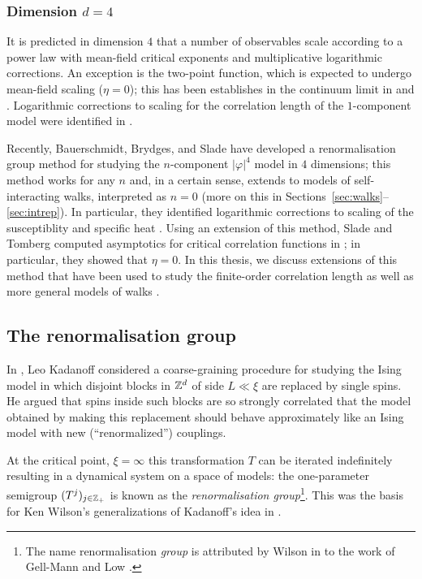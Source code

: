 \subsubsection{Dimension $d = 4$}

It is predicted in dimension $4$ that a number of observables scale according to a
power law with mean-field critical exponents and multiplicative logarithmic
corrections. An exception is the two-point function, which is expected to undergo
mean-field scaling ($\eta = 0$); this has been establishes in the continuum limit
in \cite{FMRS87} and \cite{GK85}. Logarithmic corrections to scaling for the
correlation length of the $1$-component model were identified in \cite{Hara87,HT87}.

Recently, Bauerschmidt, Brydges, and Slade have developed a renormalisation group
method for studying the $n$-component $|\varphi|^4$ model in $4$ dimensions; this
method works for any $n$ and, in a certain sense, extends to models of
self-interacting walks, interpreted as $n = 0$ (more on this in
Sections~\ref{sec:walks}--\ref{sec:intrep}).
In particular, they identified logarithmic corrections to scaling of the susceptiblity
and specific heat \cite{BBS-phi4-log}. Using an extension of this method, Slade and
Tomberg computed asymptotics for critical correlation functions in \cite{ST-phi4};
in particular, they showed that $\eta = 0$.
In this thesis, we discuss extensions of this method that have been used to study
the finite-order correlation length \cite{BSTW-clp} as well as more general models
of walks \cite{BSW-saw-sa}.


\subsection{The renormalisation group}
\label{sec:rg-intro}

In \cite{Kada66}, Leo Kadanoff considered a coarse-graining procedure for
studying the Ising model in which disjoint
blocks in ${ {{\mathbb Z}}^d }$ of side $L \ll \xi$ are replaced by single spins. He argued
that spins inside such blocks are so strongly correlated that the model
obtained by making this replacement should behave approximately like an Ising
model with new (``renormalized'') couplings.

At the critical point, $\xi = \infty$ this transformation
$T$ can be iterated indefinitely resulting in a dynamical system on a space
of models: the one-parameter semigroup $(T^j)_{j\in{\mathbb Z}_+}$ is known as the
\emph{renormalisation group}\footnote{The name
renormalisation \emph{group} is attributed by Wilson in \cite{Wils71I}
to the work of Gell-Mann and Low \cite{GML54}.}. This was the basis for Ken Wilson's
generalizations of Kadanoff's idea in \cite{Wils71I,Wils71II}.

